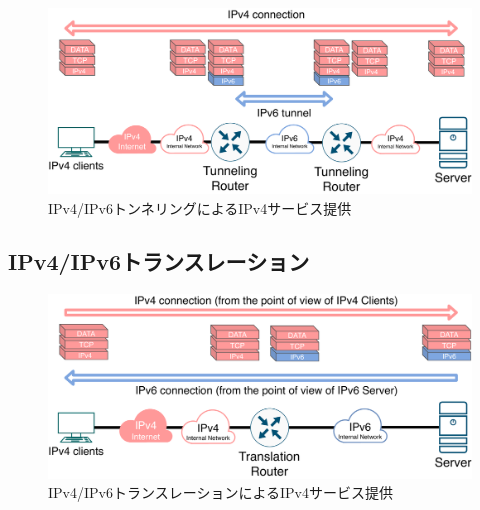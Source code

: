 \begin{figure}[h]
    \begin{center}
      \includegraphics[width=15cm,pagebox=cropbox,clip]{img/Tunneling_model.pdf}
    \end{center}
    \caption{IPv4/IPv6トンネリングによるIPv4サービス提供}
    \label{fig:tunneling_model}
\end{figure}



\subsection{IPv4/IPv6トランスレーション}
\begin{figure}[h]
    \begin{center}
      \includegraphics[width=15cm,pagebox=cropbox,clip]{img/translation_model.pdf}
    \end{center}
    \caption{IPv4/IPv6トランスレーションによるIPv4サービス提供}
    \label{fig:tunneling_model}
\end{figure}




